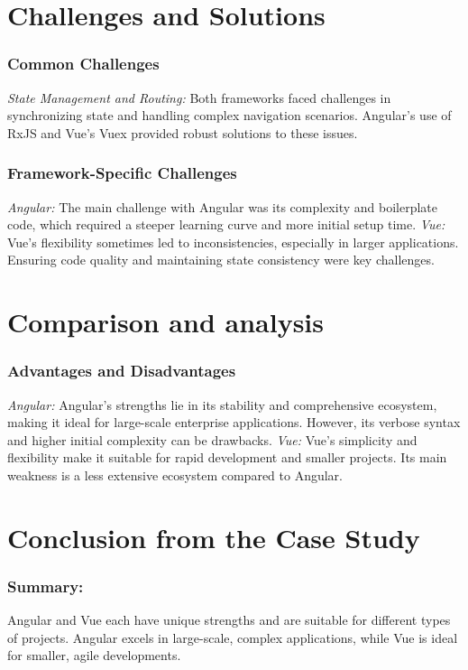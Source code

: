 \section{Challenges and Solutions}
\subsubsection{Common Challenges}
\textit{State Management and Routing: }Both frameworks faced challenges in synchronizing state and handling complex navigation scenarios. Angular's use of RxJS and Vue's Vuex provided robust solutions to these issues.
\subsubsection{Framework-Specific Challenges}
\textit{Angular: }The main challenge with Angular was its complexity and boilerplate code, which required a steeper learning curve and more initial setup time.
\newline\textit{Vue: }Vue's flexibility sometimes led to inconsistencies, especially in larger applications. Ensuring code quality and maintaining state consistency were key challenges.
\section{Comparison and analysis}
\subsubsection{Advantages and Disadvantages}
\textit{Angular: }Angular's strengths lie in its stability and comprehensive ecosystem, making it ideal for large-scale enterprise applications. However, its verbose syntax and higher initial complexity can be drawbacks.
\newline\textit{Vue: }Vue's simplicity and flexibility make it suitable for rapid development and smaller projects. Its main weakness is a less extensive ecosystem compared to Angular.

\section{Conclusion from the Case Study}
\subsubsection{Summary: }Angular and Vue each have unique strengths and are suitable for different types of projects. Angular excels in large-scale, complex applications, while Vue is ideal for smaller, agile developments.
